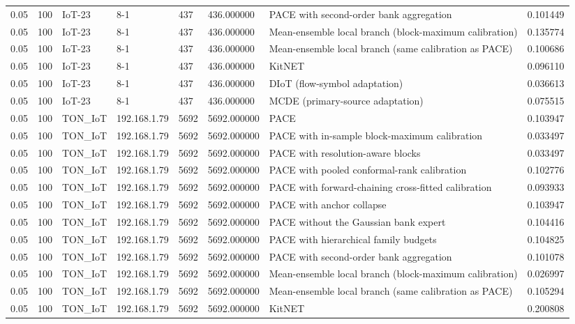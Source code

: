 \begin{tabular}{llllllll}
0.05 & 100 & IoT-23 & 8-1 & 437 & 436.000000 & PACE with second-order bank aggregation & 0.101449 \\
0.05 & 100 & IoT-23 & 8-1 & 437 & 436.000000 & Mean-ensemble local branch (block-maximum calibration) & 0.135774 \\
0.05 & 100 & IoT-23 & 8-1 & 437 & 436.000000 & Mean-ensemble local branch (same calibration as PACE) & 0.100686 \\
0.05 & 100 & IoT-23 & 8-1 & 437 & 436.000000 & KitNET & 0.096110 \\
0.05 & 100 & IoT-23 & 8-1 & 437 & 436.000000 & DIoT (flow-symbol adaptation) & 0.036613 \\
0.05 & 100 & IoT-23 & 8-1 & 437 & 436.000000 & MCDE (primary-source adaptation) & 0.075515 \\
0.05 & 100 & TON\_IoT & 192.168.1.79 & 5692 & 5692.000000 & PACE & 0.103947 \\
0.05 & 100 & TON\_IoT & 192.168.1.79 & 5692 & 5692.000000 & PACE with in-sample block-maximum calibration & 0.033497 \\
0.05 & 100 & TON\_IoT & 192.168.1.79 & 5692 & 5692.000000 & PACE with resolution-aware blocks & 0.033497 \\
0.05 & 100 & TON\_IoT & 192.168.1.79 & 5692 & 5692.000000 & PACE with pooled conformal-rank calibration & 0.102776 \\
0.05 & 100 & TON\_IoT & 192.168.1.79 & 5692 & 5692.000000 & PACE with forward-chaining cross-fitted calibration & 0.093933 \\
0.05 & 100 & TON\_IoT & 192.168.1.79 & 5692 & 5692.000000 & PACE with anchor collapse & 0.103947 \\
0.05 & 100 & TON\_IoT & 192.168.1.79 & 5692 & 5692.000000 & PACE without the Gaussian bank expert & 0.104416 \\
0.05 & 100 & TON\_IoT & 192.168.1.79 & 5692 & 5692.000000 & PACE with hierarchical family budgets & 0.104825 \\
0.05 & 100 & TON\_IoT & 192.168.1.79 & 5692 & 5692.000000 & PACE with second-order bank aggregation & 0.101078 \\
0.05 & 100 & TON\_IoT & 192.168.1.79 & 5692 & 5692.000000 & Mean-ensemble local branch (block-maximum calibration) & 0.026997 \\
0.05 & 100 & TON\_IoT & 192.168.1.79 & 5692 & 5692.000000 & Mean-ensemble local branch (same calibration as PACE) & 0.105294 \\
0.05 & 100 & TON\_IoT & 192.168.1.79 & 5692 & 5692.000000 & KitNET & 0.200808 \\

\end{tabular}
